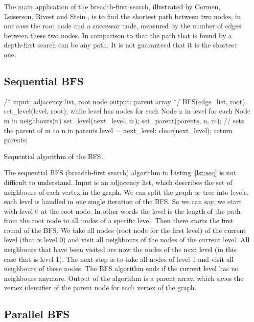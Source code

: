 \documentclass[12pt,a4paper]{article}
\begin{document}
The main application of the breadth-first search, illustrated by Cormen, Leiserson, Rivest and Stein \cite{cormen_introduction_2009}, is to find the shortest path between two nodes, in our case the root node and a successor node, measured by the number of edges between these two nodes. In comparison to that the path that is found by a depth-first search can be any path. It is not guaranteed that it is the shortest one.

\subsection{Sequential BFS}
\label{sec:sequential-bfs}

\begin{listing}[h]
\begin{ccode}
/*
input: adjacency list, root node
output: parent array
*/
BFS(edge_list, root){
	set_level(level, root);
	while level has nodes {
		for each Node n in level {
			for each Node m in neighbours(n){
				set_level(next_level, m);
				set_parent(parents, n, m); // sets the parent of m to n in parents
			}
		}
		level = next_level;
		clear(next_level);
	}
	return parents;
}
\end{ccode}
\caption{Sequential algorithm of the BFS.}
\label{lst:seq}
\end{listing}

The sequential BFS (breadth-first search) algorithm in Listing~\ref{lst:seq} is not difficult to understand. Input is an adjacency list, which describes the set of neighbours of each vertex in the graph. We can split the graph or tree into levels, each level is handled in one single iteration of the BFS. So we can say, we start with level 0 at the root node. In other words the level is the length of the path from the root node to all nodes of a specific level.
Then there starts the first round of the BFS. We take all nodes (root node for the first level) of the current level (that is level 0) and visit all neighbours of the nodes of the current level. All neighbours that have been visited are now the nodes of the next level (in this case that is level 1). The next step is to take all nodes of level 1 and visit all neighbours of these nodes. The BFS algorithm ends if the current level has no neighbours anymore. Output of the algorithm is a parent array, which saves the vertex identifier of the parent node for each vertex of the graph.

\subsection{Parallel BFS}
\label{sec:parallel-bfs}
\end{document}
